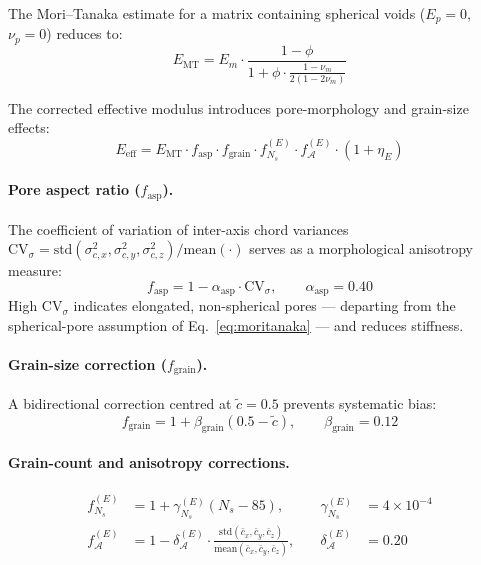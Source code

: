 \documentclass[11pt,a4paper]{article}
\begin{document}
The Mori--Tanaka estimate for a matrix containing spherical voids ($E_p = 0$, $\nu_p = 0$) reduces to:
\begin{equation}
    E_{\text{MT}} = E_m \cdot \frac{1 - \phi}{1 + \phi \cdot \frac{1 - \nu_m}{2(1 - 2\nu_m)}}
    \label{eq:moritanaka}
\end{equation}

The corrected effective modulus introduces pore-morphology and grain-size effects:
\begin{equation}
    E_{\text{eff}} = E_{\text{MT}} \cdot f_{\text{asp}} \cdot f_{\text{grain}} \cdot f_{N_s}^{(E)} \cdot f_{\mathcal{A}}^{(E)} \cdot (1 + \eta_E)
\end{equation}

\paragraph{Pore aspect ratio ($f_{\text{asp}}$).}
The coefficient of variation of inter-axis chord variances $\text{CV}_\sigma = \text{std}(\sigma^2_{c,x}, \sigma^2_{c,y}, \sigma^2_{c,z}) / \text{mean}(\cdot)$ serves as a morphological anisotropy measure:
\begin{equation}
    f_{\text{asp}} = 1 - \alpha_{\text{asp}} \cdot \text{CV}_\sigma, \qquad \alpha_{\text{asp}} = 0.40
\end{equation}
High $\text{CV}_\sigma$ indicates elongated, non-spherical pores --- departing from the spherical-pore assumption of Eq.~\eqref{eq:moritanaka} --- and reduces stiffness.

\paragraph{Grain-size correction ($f_{\text{grain}}$).}
A bidirectional correction centred at $\tilde{c} = 0.5$ prevents systematic bias:
\begin{equation}
    f_{\text{grain}} = 1 + \beta_{\text{grain}}(0.5 - \tilde{c}), \qquad \beta_{\text{grain}} = 0.12
\end{equation}

\paragraph{Grain-count and anisotropy corrections.}
\begin{align}
    f_{N_s}^{(E)} &= 1 + \gamma_{N_s}^{(E)} (N_s - 85), &\quad \gamma_{N_s}^{(E)} &= 4 \times 10^{-4} \\
    f_{\mathcal{A}}^{(E)} &= 1 - \delta_{\mathcal{A}}^{(E)} \cdot \frac{\text{std}(\bar{c}_x, \bar{c}_y, \bar{c}_z)}{\text{mean}(\bar{c}_x, \bar{c}_y, \bar{c}_z)}, &\quad \delta_{\mathcal{A}}^{(E)} &= 0.20
\end{align}
\end{document}
